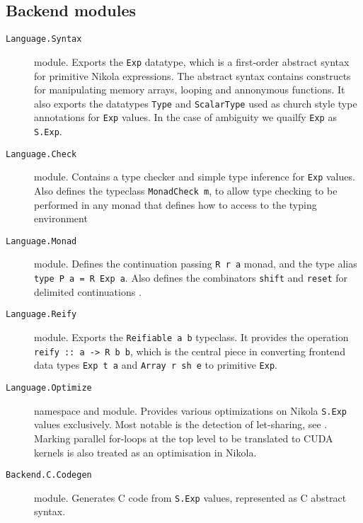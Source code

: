 \subsection*{Backend modules}
\begin{description}

  \item[\texttt{Language.Syntax}] module. Exports the \texttt{Exp} datatype,
    which is a first-order abstract syntax for primitive Nikola expressions.
    The abstract syntax contains constructs for manipulating memory arrays,
    looping and annonymous functions. It also exports the datatypes
    \texttt{Type} and \texttt{ScalarType} used as church style type annotations
    for \texttt{Exp} values. In the case of ambiguity we quailfy \texttt{Exp}
    as \texttt{S.Exp}.

  \item[\texttt{Language.Check}] module. Contains a type checker and simple type
    inference for \texttt{Exp} values. Also defines the typeclass
    \texttt{MonadCheck m}, to allow type checking to be performed in any monad
    that defines how to access to the typing environment

  \item[\texttt{Language.Monad}] module. Defines the continuation passing
    \texttt{R r a} monad, and the type alias \texttt{type P a = R Exp a}.
    Also defines the combinators \texttt{shift} and \texttt{reset} for
    delimited continuations \cite{waddler1994monads}.

  \item[\texttt{Language.Reify}] module. Exports the \texttt{Reifiable a b}
    typeclass. It provides the operation \texttt{reify :: a -> R b b},
    which is the central piece in converting frontend data types
    \texttt{Exp t a} and \texttt{Array r sh e} to primitive \texttt{Exp}.

  \item[\texttt{Language.Optimize}] namespace and module. Provides various
    optimizations on Nikola \texttt{S.Exp} values exclusively. Most notable is
    the detection of let-sharing, see \cite{mainland2010nikola}. Marking
    parallel for-loops at the top level to be translated to CUDA kernels is
    also treated as an optimisation in Nikola.

  \item[\texttt{Backend.C.Codegen}] module. Generates C code from \texttt{S.Exp}
    values, represented as C abstract syntax.

\end{description}

